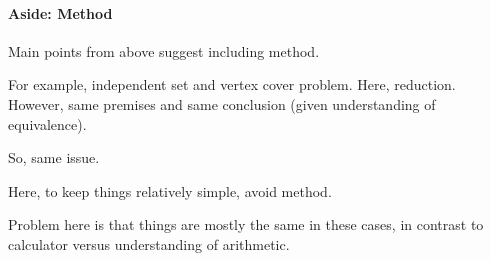 \paragraph{Aside: Method}

\begin{note}
  Main points from above suggest including method.

  For example, independent set and vertex cover problem.
  Here, reduction.
  However, same premises and same conclusion (given understanding of equivalence).

  So, same issue.

  Here, to keep things relatively simple, avoid method.

  Problem here is that things are mostly the same in these cases, in contrast to calculator versus understanding of arithmetic.
\end{note}


